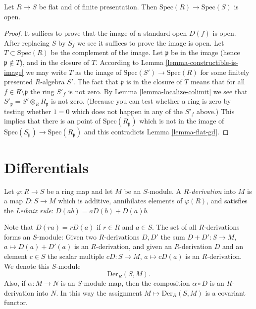 \begin{proposition}
\label{proposition-fppf-open}
Let $R \to S$ be flat and of finite presentation.
Then $\text{Spec}(R) \to \text{Spec}(S)$ is open.
\end{proposition}

\begin{proof}
It suffices to prove that the image of a standard open $D(f)$ is open.
After replacing $S$ by $S_f$ we see it suffices to prove the image is
open. Let $T \subset \text{Spec}(R)$ be the complement of the image.
Let $\mathfrak p$ be in the image (hence $\mathfrak p \not \in T$),
and in the closure of $T$. According to
Lemma \ref{lemma-constructible-is-image} we may
write $T$ as the image of $\text{Spec}(S') \to \text{Spec}(R)$
for some finitely presented $R$-algebra $S'$. The fact that $\mathfrak p$
is in the closure of $T$ means that for all $f \in R \setminus \mathfrak p$
the ring $S'_f$ is not zero. By Lemma \ref{lemma-localize-colimit}
we see that $S'_{\mathfrak p} = S' \otimes_R R_{\mathfrak p}$
is not zero. (Because you can test whether a ring is zero
by testing whether $1=0$ which does not happen in any of the
$S'_f$ above.) This implies that there is an point of
$\text{Spec}(R_{\mathfrak p})$ which is not in the image
of $\text{Spec}(S_{\mathfrak p}) \to \text{Spec}(R_{\mathfrak p})$
and this contradicts Lemma \ref{lemma-flat-gd}.
\end{proof}

\section{Differentials}
\label{section-differentials}

\begin{definition}
\label{definition-derivation}
Let $\varphi : R \to S$ be a ring map and let $M$ be an $S$-module.
A {\it $R$-derivation} into $M$ is a map $D : S \to M$
which is additive, annihilates elements of $\varphi(R)$,
and satisfies the {\it Leibniz rule}: 
$D(ab) = aD(b) + D(a)b$.
\end{definition}

\noindent
Note that $D(ra) = rD(a)$ if $r\in R$ and $a\in S$.
The set of all $R$-derivations forms an
$S$-module: Given two $R$-derivations $D, D'$
the sum $D+D' : S \to M$, $a \mapsto D(a)+D'(a)$
is an $R$-derivation, and given an $R$-derivation $D$
and an element $c\in S$ the scalar multiple $cD : S \to M$,
$a \mapsto cD(a)$ is an $R$-derivation. We denote this
$S$-module
$$
\text{Der}_R(S, M).
$$
Also, if $\alpha : M \to N$ is an $S$-module map, then the
composition $\alpha \circ D$ is an $R$-derivation into
$N$. In this way the assignment $M \mapsto \text{Der}_R(S, M)$
is a covariant functor.

